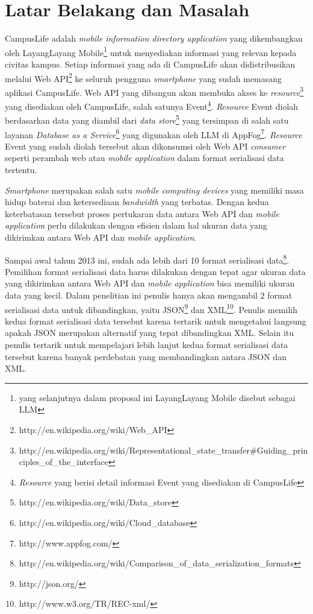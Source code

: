 \documentclass[a4paper, 12pt]{report}
\begin{document}
\section*{Latar Belakang dan Masalah}
\onehalfspacing CampusLife adalah \textit{mobile information directory application} yang dikembangkan oleh LayangLayang Mobile\footnote{yang selanjutnya dalam proposal ini LayangLayang Mobile disebut sebagai LLM} untuk menyediakan informasi yang relevan kepada civitas kampus. Setiap informasi yang ada di CampusLife akan didistribusikan melalui Web API\footnote{http://en.wikipedia.org/wiki/Web\_API} ke seluruh pengguna \textit{smartphone} yang sudah memasang aplikasi CampusLife. Web API yang dibangun akan membuka akses ke \textit{resource}\footnote{http://en.wikipedia.org/wiki/Representational\_state\_transfer\#Guiding\_principles\_of\_the\_interface} yang disediakan oleh CampusLife, salah satunya Event\footnote{\textit{Resource} yang berisi detail informasi Event yang disediakan di CampusLife}. \textit{Resource} Event diolah berdasarkan data yang diambil dari \textit{data store}\footnote{http://en.wikipedia.org/wiki/Data\_store} yang tersimpan di salah satu layanan \textit{Database as a Service}\footnote{http://en.wikipedia.org/wiki/Cloud\_database} yang digunakan oleh LLM di AppFog\footnote{http://www.appfog.com/}. \textit{Resource} Event yang sudah diolah tersebut akan dikonsumsi oleh Web API \textit{consumer} seperti perambah web atau \textit{mobile application} dalam format serialisasi data tertentu.

\onehalfspacing \textit{Smartphone} merupakan salah satu \textit{mobile computing devices} yang memiliki masa hidup baterai dan ketersediaan \textit{bandwidth} yang terbatas.\cite{challenging-issues-and-limitations-of-mobile-computing} Dengan kedua keterbatasan tersebut proses pertukaran data antara Web API dan \textit{mobile application} perlu dilakukan dengan efisien dalam hal ukuran data yang dikirimkan antara Web API dan \textit{mobile application}.

\onehalfspacing Sampai awal tahun 2013 ini, sudah ada lebih dari 10 format serialisasi data\footnote{http://en.wikipedia.org/wiki/Comparison\_of\_data\_serialization\_formats}. Pemilihan format serialisasi data harus dilakukan dengan tepat agar ukuran data yang dikirimkan antara Web API dan \textit{mobile application} bisa memiliki ukuran data yang kecil. Dalam penelitian ini penulis hanya akan mengambil 2 format serialisasi data untuk dibandingkan, yaitu JSON\footnote{http://json.org/} dan XML\footnote{http://www.w3.org/TR/REC-xml/}. Penulis memilih kedua format serialisasi data tersebut karena tertarik untuk mengetahui langsung apakah JSON merupakan alternatif yang tepat dibandingkan XML. Selain itu penulis tertarik untuk mempelajari lebih lanjut kedua format serialisasi data tersebut karena banyak perdebatan yang membandingkan antara JSON dan XML. \cite{json-vs-xml-debate}
\end{document}
